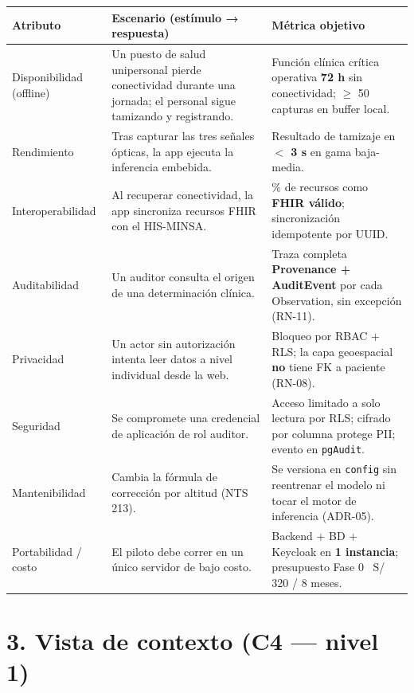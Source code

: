 \documentclass[11pt,a4paper]{article}
\begin{document}
{\small
\begin{longtable}[]{@{}
  >{\raggedright\arraybackslash}p{}
  >{\raggedright\arraybackslash}p{}
  >{\raggedright\arraybackslash}p{}@{}}
\toprule\noalign{}
Atributo & Escenario (est\'imulo → respuesta) & M\'etrica objetivo \\
\midrule\noalign{}
\endhead
\bottomrule\noalign{}
\endlastfoot
Disponibilidad (offline) & Un puesto de salud unipersonal pierde conectividad durante una jornada; el personal sigue tamizando y registrando. & Funci\'on cl\'inica cr\'itica operativa \textbf{72 h} sin conectividad; $\geq$ 50 capturas en buffer local. \\
Rendimiento & Tras capturar las tres se\~nales \'opticas, la app ejecuta la inferencia embebida. & Resultado de tamizaje en \textbf{$<$ 3 s} en gama baja-media. \\
Interoperabilidad & Al recuperar conectividad, la app sincroniza recursos FHIR con el HIS-MINSA. & 100\% de recursos como \textbf{FHIR v\'alido}; sincronizaci\'on idempotente por UUID. \\
Auditabilidad & Un auditor consulta el origen de una determinaci\'on cl\'inica. & Traza completa \textbf{Provenance + AuditEvent} por cada Observation, sin excepci\'on (RN-11). \\
Privacidad & Un actor sin autorizaci\'on intenta leer datos a nivel individual desde la web. & Bloqueo por RBAC + RLS; la capa geoespacial \textbf{no} tiene FK a paciente (RN-08). \\
Seguridad & Se compromete una credencial de aplicaci\'on de rol auditor. & Acceso limitado a solo lectura por RLS; cifrado por columna protege PII; evento en \texttt{pgAudit}. \\
Mantenibilidad & Cambia la f\'ormula de correcci\'on por altitud (NTS 213). & Se versiona en \texttt{config} sin reentrenar el modelo ni tocar el motor de inferencia (ADR-05). \\
Portabilidad / costo & El piloto debe correr en un \'unico servidor de bajo costo. & Backend + BD + Keycloak en \textbf{1 instancia}; presupuesto Fase 0 ~S/ 320 / 8 meses. \\
\end{longtable}
}

\section{3. Vista de contexto (C4 --- nivel 1)}\label{contexto}
\end{document}
